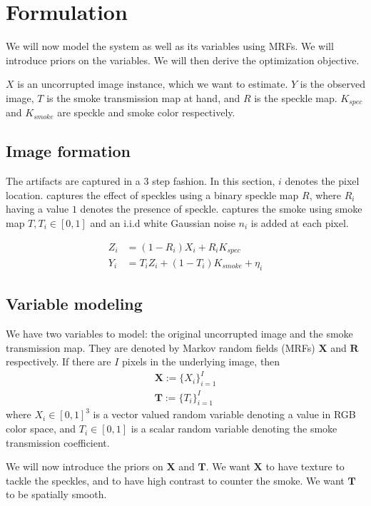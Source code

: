 \chapter{Formulation}

We will now model the system as well as its variables using MRFs. We will introduce priors on the variables. We will then derive the optimization objective.

$X$ is an uncorrupted image instance, which we want to estimate. $Y$ is the observed image, $T$ is the smoke transmission map at hand, and $R$ is the speckle map. $K_{spec}$ and $K_{smoke}$ are speckle and smoke color respectively.

\section{Image formation}
The artifacts are captured in a 3 step fashion. In this section, $i$ denotes the pixel location.  captures the effect of speckles using a binary speckle map $R$, where $R_i$ having a value $1$ denotes the presence of speckle.  captures the smoke using smoke map $T, T_i \in [0, 1]$ and an i.i.d white Gaussian noise $n_i$ is added at each pixel.

\begin{align}
    Z_i &= (1 - R_i) X_i  + R_i K_{spec} \label{eqn:speckle} \\
    Y_i &= T_i Z_i + (1 - T_i) K_{smoke} + \eta_i \label{eqn:smokenoise}
\end{align}

\section{Variable modeling}
We have two variables to model: the original uncorrupted image and the smoke transmission map. They are denoted by Markov random fields (MRFs) $\mathbf{X}$ and $\mathbf{R}$ respectively. If there are $I$ pixels in the underlying image, then
\begin{align}
    \mathbf{X} := \lbrace X_i \rbrace_{i=1}^{I} \\
    \mathbf{T} := \lbrace T_i \rbrace_{i=1}^{I} 
\end{align}
where $X_i \in [0, 1]^3$ is a vector valued random variable denoting a value in RGB color space, and $T_i \in [0, 1]$ is a scalar random variable denoting the smoke transmission coefficient.

We will now introduce the priors on $\mathbf{X}$ and $\mathbf{T}$. We want $\mathbf{X}$ to have texture to tackle the speckles, and to have high contrast to counter the smoke. We want $\mathbf{T}$ to be spatially smooth.


